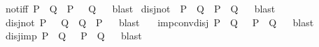 \begin{isabellebody}
\endisatagproof
{\isafoldproof}%
%
\isadelimproof
%
\endisadelimproof
\isanewline
{}\isamarkupfalse%
\ not{\isacharunderscore}{\kern0pt}iff{\isacharcolon}{\kern0pt}\ {\isachardoublequoteopen}P\ {\isasymnoteq}\ Q\ {\isasymlongleftrightarrow}\ {\isacharparenleft}{\kern0pt}P\ {\isasymlongleftrightarrow}\ {\isasymnot}\ Q{\isacharparenright}{\kern0pt}{\isachardoublequoteclose}%
\isadelimproof
\ %
\endisadelimproof
%
\isatagproof
{}\isamarkupfalse%
\ blast%
\endisatagproof
{\isafoldproof}%
%
\isadelimproof
%
\endisadelimproof
\isanewline
{}\isamarkupfalse%
\ disj{\isacharunderscore}{\kern0pt}not{}{\isacharcolon}{\kern0pt}\ {\isachardoublequoteopen}{\isasymnot}\ P\ {\isasymor}\ Q\ {\isasymlongleftrightarrow}\ {\isacharparenleft}{\kern0pt}P\ {\isasymlongrightarrow}\ Q{\isacharparenright}{\kern0pt}{\isachardoublequoteclose}%
\isadelimproof
\ %
\endisadelimproof
%
\isatagproof
{}\isamarkupfalse%
\ blast%
\endisatagproof
{\isafoldproof}%
%
\isadelimproof
%
\endisadelimproof
\isanewline
{}\isamarkupfalse%
\ disj{\isacharunderscore}{\kern0pt}not{}{\isacharcolon}{\kern0pt}\ {\isachardoublequoteopen}P\ {\isasymor}\ {\isasymnot}\ Q\ {\isasymlongleftrightarrow}\ {\isacharparenleft}{\kern0pt}Q\ {\isasymlongrightarrow}\ P{\isacharparenright}{\kern0pt}{\isachardoublequoteclose}%
\isadelimproof
\ %
\endisadelimproof
%
\isatagproof
{}\isamarkupfalse%
\ blast\ \ %
%
\endisatagproof
{\isafoldproof}%
%
\isadelimproof
%
\endisadelimproof
\isanewline
{}\isamarkupfalse%
\ imp{\isacharunderscore}{\kern0pt}conv{\isacharunderscore}{\kern0pt}disj{\isacharcolon}{\kern0pt}\ {\isachardoublequoteopen}{\isacharparenleft}{\kern0pt}P\ {\isasymlongrightarrow}\ Q{\isacharparenright}{\kern0pt}\ {\isasymlongleftrightarrow}\ {\isacharparenleft}{\kern0pt}{\isasymnot}\ P{\isacharparenright}{\kern0pt}\ {\isasymor}\ Q{\isachardoublequoteclose}%
\isadelimproof
\ %
\endisadelimproof
%
\isatagproof
{}\isamarkupfalse%
\ blast%
\endisatagproof
{\isafoldproof}%
%
\isadelimproof
%
\endisadelimproof
\isanewline
{}\isamarkupfalse%
\ disj{\isacharunderscore}{\kern0pt}imp{\isacharcolon}{\kern0pt}\ {\isachardoublequoteopen}P\ {\isasymor}\ Q\ {\isasymlongleftrightarrow}\ {\isasymnot}\ P\ {\isasymlongrightarrow}\ Q{\isachardoublequoteclose}%
\isadelimproof
\ %
\endisadelimproof
%
\isatagproof
{}\isamarkupfalse%
\ blast%
\endisatagproof
{\isafoldproof}%
%
\isadelimproof
%
\endisadelimproof
\isanewline
\isanewline

\end{isabellebody}
